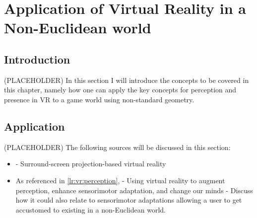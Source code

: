 \section{Application of Virtual Reality in a Non-Euclidean world}
\label{lr:cross}

\begin{multicols*}{2}
	\subsection{Introduction}
	\label{lr:cross:intro}
		(PLACEHOLDER) In this section I will introduce the concepts to be covered in this chapter, namely how one can apply the key concepts for perception and presence in VR to a game world using non-standard geometry.
	
	\subsection{Application}
	\label{lr:cross:application}
		(PLACEHOLDER) The following sources will be discussed in this section:
		\begin{itemize}
			\item \cite{Cruz-Neira1993} - Surround-screen projection-based virtual reality
			\item As referenced in \ref{lr:vr:perception}, \cite{Wright2014} - Using virtual reality to augment perception, enhance sensorimotor adaptation, and change our minds - Discuss how it could also relate to sensorimotor adaptations allowing a user to get accustomed to existing i\textsl{}n a non-Euclidean world.
		\end{itemize}
	

\end{multicols*}
